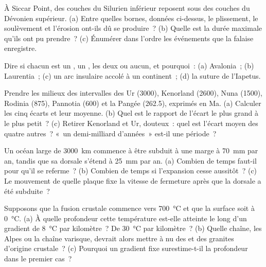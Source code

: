 \begin{exercise}[$\star$]\label{exo:b2:wilson-cycle:3}
À Siccar Point, des couches du Silurien inférieur reposent sous des couches du Dévonien supérieur. (a) Entre quelles bornes,
données ci-dessus, le plissement, le soulèvement et l'érosion ont-ils dû se produire~? (b) Quelle est
la durée maximale qu'ils ont pu prendre~? (c) Énumérer dans l'ordre les événements que la falaise enregistre.
\end{exercise}

\begin{exercise}[$\star$]\label{exo:b2:wilson-cycle:4}
Dire si chacun est un , un , les deux ou aucun, et pourquoi~: (a) Avalonia~;
(b) Laurentia~; (c) un arc insulaire accolé à un continent~; (d) la suture de l'Iapetus.
\end{exercise}

\begin{exercise}[$\star\star$]\label{exo:b2:wilson-cycle:5}
Prendre les milieux des intervalles des  Ur (3000), Kenorland (2600),
Nuna (1500), Rodinia (875), Pannotia (600) et la Pangée (262.5), exprimés en Ma.
(a) Calculer les cinq écarts et leur moyenne. (b) Quel est le rapport de l'écart le plus grand à
le plus petit~? (c) Retirer Kenorland et Ur, douteux~: quel est l'écart moyen des
quatre autres~? «~un demi-milliard d'années~» est-il une période~?
\end{exercise}

\begin{exercise}[$\star\star$]\label{exo:b2:wilson-cycle:6}
Un océan large de \qty{3000}{km} commence à être subduit à une marge à \qty{70}{mm} par an,
tandis que sa dorsale s'étend à \qty{25}{mm} par an. (a) Combien de temps faut-il pour qu'il se referme~?
(b) Combien de temps si l'expansion cesse aussitôt~? (c) Le mouvement de quelle plaque fixe la vitesse de fermeture après
que la dorsale a été subduite~?
\end{exercise}

\begin{exercise}[$\star\star$]\label{exo:b2:wilson-cycle:7}
Supposons que la fusion crustale commence vers \qty{700}{\celsius} et que la surface soit à
\qty{0}{\celsius}. (a) À quelle profondeur cette température est-elle atteinte le long d'un gradient de
\qty{8}{\celsius} par kilomètre~? De \qty{30}{\celsius} par kilomètre~? (b) Quelle chaîne, les Alpes ou
la chaîne varisque, devrait alors mettre à nu des  et des granites d'origine crustale~?
(c) Pourquoi un gradient fixe surestime-t-il la profondeur dans le premier cas~?
\end{exercise}

